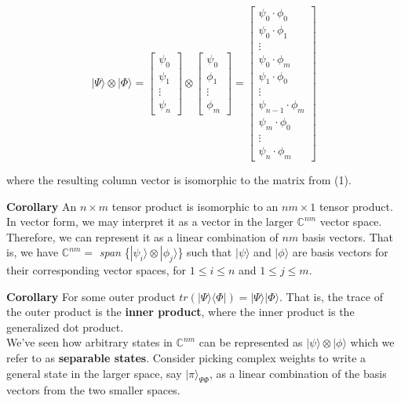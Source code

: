 \documentclass[letterpaper, 10 pt, conference]{ieeeconf}
\begin{document}
\begin{equation}
|\Psi\rangle \otimes |\Phi\rangle =
\begin{bmatrix}\psi_0 \\ \psi_1 \\ \vdots \\ \psi_n \end{bmatrix} \otimes
\begin{bmatrix}\psi_0 \\ \phi_1 \\ \vdots \\ \phi_m \end{bmatrix} = 
\begin{bmatrix}\psi_0 \cdot \phi_0 \\ \psi_0 \cdot \phi_1 \\ \vdots \\ \psi_0 \cdot \phi_m \\
\psi_1 \cdot \phi_0 \\ \vdots \\ \psi_{n-1} \cdot \phi_m \\ \psi_{m} \cdot \phi_0 \\
\vdots \\ \psi_n \cdot \phi_m
\end{bmatrix}
\end{equation}

where the resulting column vector is isomorphic to the matrix from (1).

\textbf{Corollary} An \( n \times m \) tensor product is isomorphic to an \( nm \times 1 \) tensor product.  In vector form, we may interpret it as a vector in the larger \( \mathbb{C}^{nm} \) vector space.  Therefore, we can represent it as a linear combination of \( nm \) basis vectors.  That is, we have \( \mathbb{C}^{nm} = \) \textit{span} \{\( {|\psi_i\rangle \otimes |\phi_j\rangle } \)\} such that \( |\psi\rangle \) and \( |\phi\rangle \) are basis vectors for their corresponding vector spaces, for \( 1 \leq i \leq n \) and \( 1 \leq j \leq m \).

\textbf{Corollary} For some outer product \( tr(|\Psi\rangle \langle\Phi|) = |\Psi\rangle |\Phi\rangle \).  That is, the trace of the outer product is the \textbf{inner product}, where the inner product is the generalized dot product.\\

We've seen how arbitrary states in \( \mathbb{C}^{nm} \) can be represented as \( {|\psi\rangle \otimes |\phi\rangle } \) which we refer to as \textbf{separable states}.  Consider picking complex weights to write a general state in the larger space, say \( |\pi\rangle_{\Psi\Phi} \), as a linear combination of the basis vectors from the two smaller spaces.
\end{document}
